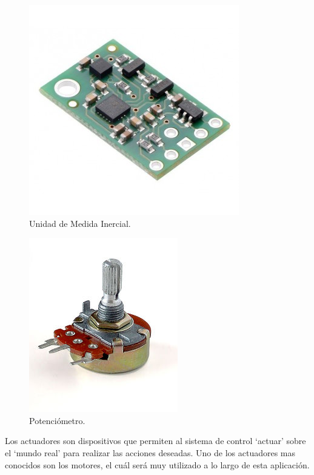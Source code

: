 \begin{center}
	\begin{figure}[H]
		\center
		\includegraphics[scale=0.4]{imagenes/EstadoArte/IMU.jpg}
		\caption{Unidad de Medida Inercial.}
		\label{fig:IMU}
	\end{figure}
\end{center}

\begin{center}
	\begin{figure}[H]
		\center
		\includegraphics[scale=0.4]{imagenes/EstadoArte/potentiometer.jpg}
		\caption{Potenciómetro.}
		\label{fig:potentiometer}
	\end{figure}
\end{center}

Los actuadores son dispositivos que permiten al sistema de control ‘actuar’ sobre el ‘mundo real’ para realizar las acciones deseadas. Uno de los actuadores mas conocidos son los motores, el cuál será muy utilizado a lo largo de esta aplicación.  \newline

